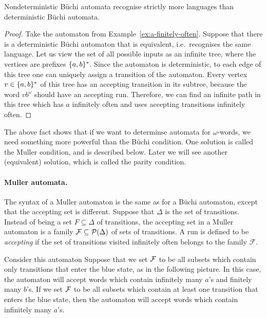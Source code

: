 \begin{fact}
Nondeterministic Büchi automata recognise strictly more languages than deterministic Büchi automata.	
\end{fact}
\begin{proof}
Take the automaton from Example~\ref{ex:a-finitely-often}.
  Suppose that there is a deterministic Büchi automaton that is equivalent, i.e.~recognises the same language. Let us view the set of all possible inputs as an infinite tree, where the vertices are prefixes $\{a,b\}^*$.  Since the automaton is deterministic, to each edge of this tree one can uniquely assign a transition of the automaton. Every vertex $v \in \{a,b\}^*$ of this tree has an accepting transition in its subtree,  because the word $vb^\omega$ should have an accepting run. Therefore, we can find an infinite path in this tree which  has $a$ infinitely often and uses accepting transitions infinitely often.	
\end{proof}




The above fact shows that if we want to determinse automata for $\omega$-words, we need something more powerful than the Büchi condition. One solution is called the Muller condition, and is described below. Later we will see another (equivalent) solution, which is called the parity condition.





\paragraph*{Muller automata.}
The syntax of a Muller automaton is the same as for a Büchi automaton, except that the accepting set is different. Suppose that $\Delta$ is the set of transitions. Instead of being a set $F \subseteq \Delta$ of transitions, the accepting set in a Muller automaton  is a family $\mathcal F \subseteq {\cal P}(\Delta)$ of sets of transitions. A run is defined to be \emph{accepting} if the set of transitions visited infinitely often belongs to the family $\mathcal F$. 

\begin{example}
	Consider this automaton 
	Suppose that we set $\mathcal{F}$ to be all subsets which contain only  transitions that  enter the blue state, as in the following picture.
	 In this case, the automaton will accept words which contain infinitely many $a$'s and finitely many $b$'s.	
	If we set $\mathcal{F}$ to be all subsets which contain at least one  transition that  enters the blue state, then the automaton will accept words which contain infinitely many $a$'s.	
\end{example}
%

